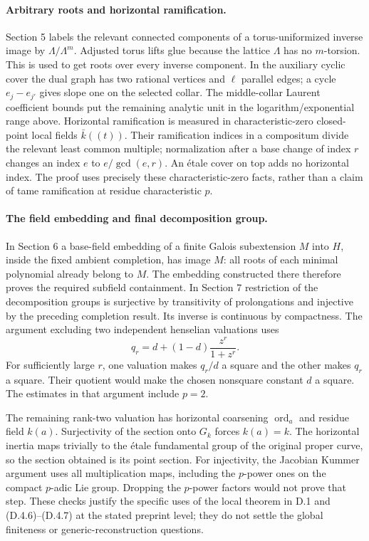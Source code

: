 \paragraph{Arbitrary roots and horizontal ramification.}
Section 5 labels the relevant connected components of a
torus-uniformized inverse image by
$\Lambda/\Lambda^m$. Adjusted torus lifts glue because the
lattice $\Lambda$ has no $m$-torsion. This is used to get
roots over every inverse component. In the auxiliary
cyclic cover the dual graph has two rational vertices and
$\ell$ parallel edges; a cycle $e_j-e_{j'}$ gives slope
one on the selected collar. The middle-collar Laurent
coefficient bounds put the remaining analytic unit in the
logarithm/exponential range above. Horizontal ramification
is measured in characteristic-zero closed-point local
fields $\bar k((t))$. Their ramification indices in a
compositum divide the relevant least common multiple;
normalization after a base change of index $r$ changes an
index $e$ to $e/\gcd(e,r)$. An \'etale cover on top adds
no horizontal index. The proof uses precisely these
characteristic-zero facts, rather than a claim of tame
ramification at residue characteristic $p$.

\paragraph{The field embedding and final decomposition group.}
In Section 6 a base-field embedding of a finite Galois
subextension $M$ into $H$, inside the fixed ambient
completion, has image $M$: all roots of each minimal
polynomial already belong to $M$. The embedding constructed
there therefore proves the required subfield containment.
In Section 7 restriction of the decomposition groups is
surjective by transitivity of prolongations and injective
by the preceding completion result. Its inverse is
continuous by compactness. The argument excluding two
independent henselian valuations uses
\[
 q_r=d+(1-d)\frac{z^r}{1+z^r}.
\]
For sufficiently large $r$, one valuation makes $q_r/d$
a square and the other makes $q_r$ a square. Their quotient
would make the chosen nonsquare constant $d$ a square.
The estimates in that argument include $p=2$.

The remaining rank-two valuation has horizontal
coarsening $\operatorname{ord}_a$ and residue field $k(a)$.
Surjectivity of the section onto $G_k$ forces $k(a)=k$.
The horizontal inertia maps trivially to the \'etale
fundamental group of the original proper curve, so the
section obtained is its point section. For injectivity,
the Jacobian Kummer argument uses all multiplication maps,
including the $p$-power ones on the compact $p$-adic Lie
group. Dropping the $p$-power factors would not prove that
step. These checks justify the specific uses of the local
theorem in D.1 and (D.4.6)--(D.4.7) at the stated
preprint level; they do not settle the global finiteness
or generic-reconstruction questions.
